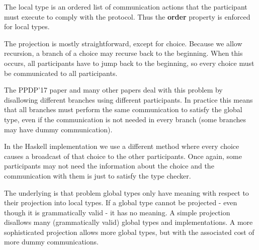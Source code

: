 \documentclass[runningheads,plain]{llncs}
\begin{document}
The local type is an ordered list of communication actions that the
participant must execute to comply with the protocol. Thus the
\textbf{order} property is enforced for local types.

The projection is mostly straightforward, except for choice. Because we
allow recursion, a branch of a choice may recurse back to the beginning.
When this occurs, all participants have to jump back to the beginning,
so every choice must be communicated to all participants.

The PPDP'17 paper and many other papers deal with this problem by
disallowing different branches using different participants. In practice
this means that all branches must perform the same communication to
satisfy the global type, even if the communication is not needed in
every branch (some branches may have dummy communication).

In the Haskell implementation we use a different method where every
choice causes a broadcast of that choice to the other participants. Once
again, some participants may not need the information about the choice
and the communication with them is just to satisfy the type checker.

The underlying is that problem global types only have meaning with
respect to their projection into local types. If a global type cannot be
projected - even though it is grammatically valid - it has no meaning. A
simple projection disallows many (grammatically valid) global types and
implementations. A more sophisticated projection allows more global
types, but with the associated cost of more dummy communications.
\end{document}
